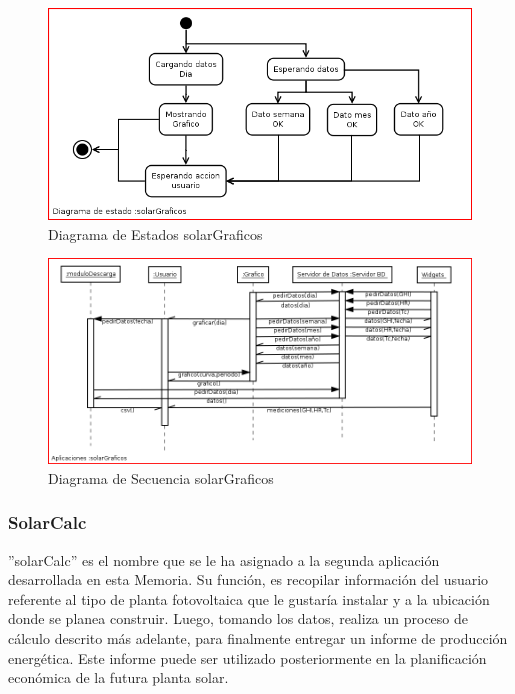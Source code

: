 \newpage
\begin{figure}[h!]
        \centering
        \includegraphics[scale=0.5]{images/graficosEstados}
        \caption{Diagrama de Estados solarGraficos}
        \label{solarGraficoE}
\end{figure}

\begin{figure}[h!]
        \centering
        \includegraphics[scale=0.35]{images/graficosSecuencia}
        \caption{Diagrama de Secuencia solarGraficos}
        \label{solarGraficoS}
\end{figure}

\newpage
\subsubsection{SolarCalc}
''solarCalc'' es el nombre que se le ha asignado a la segunda aplicación desarrollada en esta Memoria. Su función, es recopilar información del usuario referente al tipo de planta fotovoltaica que le gustaría instalar y a la ubicación donde se planea construir. Luego, tomando los datos, realiza un proceso de cálculo descrito más adelante, para finalmente entregar un informe de producción energética. Este informe puede ser utilizado posteriormente en la planificación económica de la futura planta solar.\\

